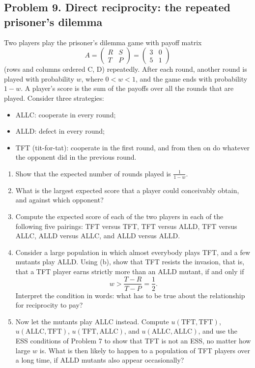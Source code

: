 \documentclass[a4paper,12pt]{article}
\begin{document}
\subsection*{Problem 9. Direct reciprocity: the repeated prisoner's dilemma}

Two players play the prisoner's dilemma game with payoff matrix
\[ A = \begin{pmatrix} R & S\\ T & P \end{pmatrix} = \begin{pmatrix} 3 & 0\\ 5 & 1 \end{pmatrix} \]
(rows and columns ordered C, D) repeatedly. After each round, another round is played with probability $w$, where $0<w<1$, and the game ends with probability $1-w$. A player's score is the sum of the payoffs over all the rounds that are played. Consider three strategies:
\begin{itemize}
\item ALLC: cooperate in every round;
\item ALLD: defect in every round;
\item TFT (tit-for-tat): cooperate in the first round, and from then on do whatever the opponent did in the previous round.
\end{itemize}

\begin{enumerate}[label=(\alph*)]
\item Show that the expected number of rounds played is $\frac{1}{1-w}$.

\item What is the largest expected score that a player could conceivably obtain, and against which opponent?

\item Compute the expected score of each of the two players in each of the following five pairings: TFT versus TFT, TFT versus ALLD, TFT versus ALLC, ALLD versus ALLC, and ALLD versus ALLD.

\item Consider a large population in which almost everybody plays TFT, and a few mutants play ALLD. Using (b), show that TFT resists the invasion, that is, that a TFT player earns strictly more than an ALLD mutant, if and only if
\[ w > \frac{T-R}{T-P} = \frac{1}{2} . \]
Interpret the condition in words: what has to be true about the relationship for reciprocity to pay?

\item Now let the mutants play ALLC instead. Compute $u(\text{TFT},\text{TFT})$, $u(\text{ALLC},\text{TFT})$, $u(\text{TFT},\text{ALLC})$, and $u(\text{ALLC},\text{ALLC})$, and use the ESS conditions of Problem 7 to show that TFT is not an ESS, no matter how large $w$ is. What is then likely to happen to a population of TFT players over a long time, if ALLD mutants also appear occasionally?

\end{enumerate}
\end{document}
